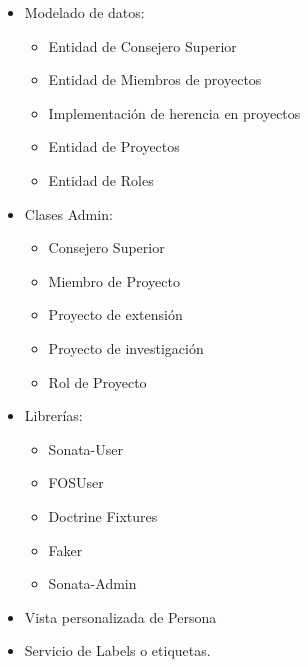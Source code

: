\begin{itemize}
    \item Modelado de datos:
    \begin{itemize}
        \item Entidad de Consejero Superior
        \item Entidad de Miembros de proyectos
        \item Implementación de herencia en proyectos
        \item Entidad de Proyectos
        \item Entidad de Roles
    \end{itemize}
    \item Clases Admin:
    \begin{itemize}
        \item Consejero Superior
        \item Miembro de Proyecto
        \item Proyecto de extensión
        \item Proyecto de investigación
        \item Rol de Proyecto
    \end{itemize}
    \item Librerías:
    \begin{itemize}
        \item Sonata-User
        \item FOSUser
        \item Doctrine Fixtures
        \item Faker
        \item Sonata-Admin
    \end{itemize}
    \item Vista personalizada de Persona
    \item Servicio de Labels o etiquetas.
\end{itemize}
